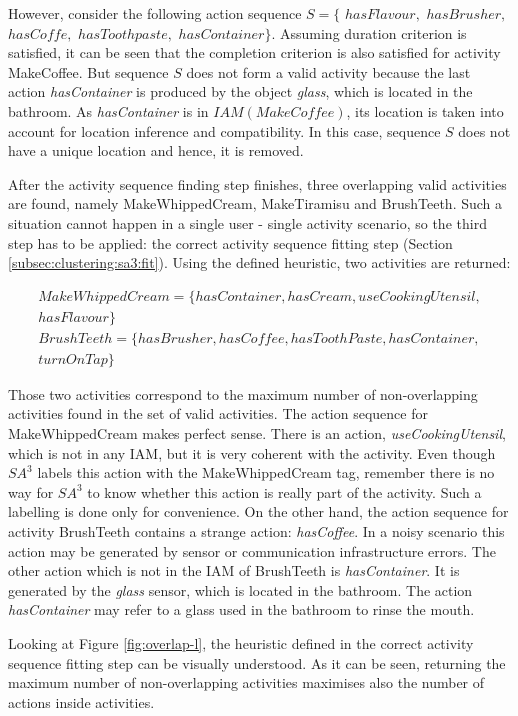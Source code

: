 However, consider the following action sequence $S = \{$ $hasFlavour,$ $hasBrusher,$ $hasCof\!fe,$ $hasToothpaste,$ $hasContainer\}$. Assuming duration criterion is satisfied, it can be seen that the completion criterion is also satisfied for activity MakeCoffee. But sequence $S$ does not form a valid activity because the last action \textit{hasContainer} is produced by the object \textit{glass}, which is located in the bathroom. As \textit{hasContainer} is in $IAM(MakeCof\!fee)$, its location is taken into account for location inference and compatibility. In this case, sequence $S$ does not have a unique location and hence, it is removed. 

After the activity sequence finding step finishes, three overlapping valid activities are found, namely MakeWhippedCream, MakeTiramisu and BrushTeeth. Such a situation cannot happen in a single user - single activity scenario, so the third step has to be applied: the correct activity sequence fitting step (Section \ref{subsec:clustering:sa3:fit}). Using the defined heuristic, two activities are returned:

\begin{equation*}
  \begin{split}   
  MakeWhippedCream = \{hasContainer, hasCream, useCookingUtensil,\\ 
  hasFlavour\} \\
  BrushTeeth = \{hasBrusher, hasCof\!fee, hasToothPaste, hasContainer,\\ 
  turnOnTap\} 
  \end{split}
 \end{equation*} 

Those two activities correspond to the maximum number of non-overlapping activities found in the set of valid activities. The action sequence for MakeWhippedCream makes perfect sense. There is an action, \textit{useCookingUtensil}, which is not in any IAM, but it is very coherent with the activity. Even though $SA^3$ labels this action with the MakeWhippedCream tag, remember there is no way for $SA^3$ to know whether this action is really part of the activity. Such a labelling is done only for convenience. On the other hand, the action sequence for activity BrushTeeth contains a strange action: \textit{hasCoffee}. In a noisy scenario this action may be generated by sensor or communication infrastructure errors. The other action which is not in the IAM of BrushTeeth is \textit{hasContainer}. It is generated by the \textit{glass} sensor, which is located in the bathroom. The action \textit{hasContainer} may refer to a glass used in the bathroom to rinse the mouth. 

Looking at Figure \ref{fig:overlap-l}, the heuristic defined in the correct activity sequence fitting step can be visually understood. As it can be seen, returning the maximum number of non-overlapping activities maximises also the number of actions inside activities.